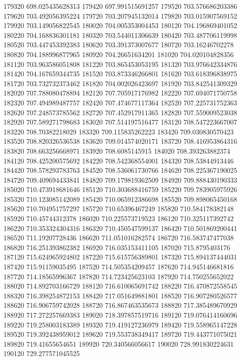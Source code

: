 {179320 698.025435628313
179420 697.991515691257
179520 703.576686203386
179620 703.492056395224
179720 703.207945132014
179820 703.015907569152
179920 703.149056822545
180020 704.005353004453
180120 704.196869401052
180220 704.168836301181
180320 703.544011306639
180420 703.487706119998
180520 703.447453392383
180620 703.391373007677
180720 703.16246702278
180820 704.188996877965
180920 704.26651634201
181020 704.020104828356
181120 703.963586051808
181220 703.865453053195
181320 703.976642334876
181420 704.167659344735
181520 703.873346266801
181620 703.618396838975
181720 703.732732373462
181820 704.002026423697
181920 703.842541309329
182020 707.788080478894
182120 707.705917176982
182220 707.694071750758
182320 707.494989487757
182420 707.474677117364
182520 707.225731752363
182620 707.248573785562
182720 707.452917911365
182820 707.559009523038
182920 707.589271798683
183020 707.514197516477
183120 708.547223667007
183220 708.70382218029
183320 709.115835262223
183420 709.030830570423
183520 708.820326536538
183620 709.014574020171
183720 708.416953864316
183820 708.663256668971
183920 708.6085145915
184020 708.393263882374
184120 708.425200575692
184220 708.542368554001
184320 708.53844913446
184420 708.578293783763
184520 708.536061730766
184620 708.225367190025
184720 709.409694433841
184820 709.179819362509
184920 709.888430190333
185020 710.473918681646
185120 710.303688416759
185220 709.783905975926
185320 710.123085142089
185420 710.065912386698
185520 709.898065450168
185620 710.704951757297
185720 710.65396467249
185820 710.584178382148
185920 710.45744312378
186020 710.225573719523
186120 710.325117392742
186220 710.353324304316
186320 710.450547599137
186420 710.501869200441
186520 711.19207728436
186620 711.051016282574
186720 716.583747477038
186820 716.251393862382
186920 716.035153411105
187020 715.8795403176
187120 715.624965924802
187220 715.615756389801
187320 715.894137444031
187420 715.91159035495
187520 714.505354209457
187620 714.945146681816
187720 714.18565996367
187820 714.723425623103
187920 714.750255652022
188020 714.892703166729
188120 716.610065691742
188220 716.470872558545
188320 716.398254872153
188420 717.051649881801
188520 716.907280526577
188620 716.906759742028
188720 716.867463535673
188820 717.385489670929
188920 717.272257669383
189020 718.397857519716
189120 719.076414160696
189220 719.258003183389
189320 719.419127236979
189420 719.558965147228
189520 719.392438959012
189620 719.553738349417
189720 719.443771075021
189820 719.41655654651
189920 720.340566056617
190020 728.991830224631
190120 729.277571045525
}
